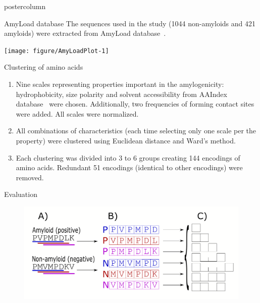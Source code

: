 \documentclass[final]{beamer}\usepackage[]{graphicx}\usepackage[]{color}
\makeatletter
\def\maxwidth{ %
  \ifdim\Gin@nat@width>\linewidth
    \linewidth
  \else
    \Gin@nat@width
  \fi
}
\newenvironment{knitrout}{}{} %
\makeatother
\begin{document}
\begin{frame}
\begin{columns}
\begin{column}{.485\textwidth}
\begin{beamercolorbox}[center,wd=\textwidth]{postercolumn}
\begin{minipage}[T]{.95\textwidth}
{\begin{block}{AmyLoad database}
The sequences used in the study (1044 non-amyloids and 421 amyloids) were extracted from AmyLoad database~\citep{wozniak_amyload:_2015}.

\begin{knitrout}
\color{fgcolor}
\texttt{[image: figure/AmyLoadPlot-1]} 

\end{knitrout}


\end{block}
\vfill



\begin{block}{Clustering of amino acids}

\begin{enumerate}[1.]
\item Nine scales representing properties important in the amylogenicity: hydrophobicity, size polarity and solvent accessibility from AAIndex database~\citep{kawashima_aaindex:_2008} were chosen. Additionally, two frequencies of forming contact sites~\citep{wozniak_characteristics_2014} were added. All scales were normalized.
\item All combinations of characteristics (each time selecting only one scale per the property) were clustered using Euclidean distance and Ward's method.
\item Each clustering was divided into 3 to 6 groups creating 144 encodings of amino acids. Redundant 51 encodings (identical to other encodings) were removed.
\end{enumerate}

\end{block}
\vfill

\begin{block}{Evaluation}

\begin{figure}
\includegraphics[width=\maxwidth]{ngram_scheme}
\end{figure}


\end{block}}
\end{minipage}
\end{beamercolorbox}
\end{column}
\end{columns}
\end{frame}
\end{document}
